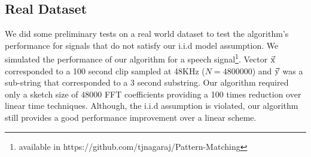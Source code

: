 \subsection{Real Dataset}
We did some preliminary tests on a real world dataset to test the algorithm's performance for signals that do not satisfy our i.i.d model assumption. We simulated the performance of our algorithm for a speech signal\footnote{available in https://github.com/tjnagaraj/Pattern-Matching}. Vector $\vec{\mathrm{x}}$ corresponded to a 100 second clip sampled at 48KHz ($N=4800000$) and $\vec{\mathrm{y}}$ was a sub-string that corresponded to a 3 second substring. Our algorithm required only a sketch size of $48000$ FFT coefficients providing a 100 times reduction over linear time techniques. Although, the i.i.d assumption is violated, our algorithm still provides a good performance improvement over a linear scheme. 

 		